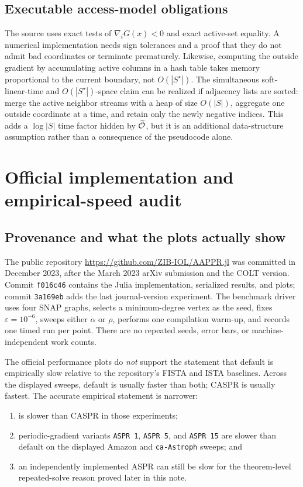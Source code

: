 \documentclass[11pt]{article}
\begin{document}
\subsection{Executable access-model obligations}

The source uses exact tests of $\nabla_iG(x)<0$ and exact active-set equality.
A numerical implementation needs sign tolerances and a proof that they do not
admit bad coordinates or terminate prematurely.  Likewise, computing the
outside gradient by accumulating active columns in a hash table takes memory
proportional to the current boundary, not $O(|S^\star|)$.  The simultaneous
soft-linear-time and $O(|S^\star|)$-space claim can be realized if adjacency
lists are sorted: merge the active neighbor streams with a heap of size
$O(|S|)$, aggregate one outside coordinate at a time, and retain only the
newly negative indices.  This adds a $\log|S|$ time factor hidden by
$\widetilde{\mathcal{O}}$, but it is an additional data-structure assumption rather than a
consequence of the pseudocode alone.

\section{Official implementation and empirical-speed audit}
\label{sec:implementation-audit}

\subsection{Provenance and what the plots actually show}

The public repository
\url{https://github.com/ZIB-IOL/AAPPR.jl} was committed in December 2023,
after the March 2023 arXiv submission and the COLT version.  Commit
\texttt{f016c46} contains the Julia implementation, serialized results, and
plots; commit \texttt{3a169eb} adds the last journal-version experiment.  The
benchmark driver uses four SNAP graphs, selects a minimum-degree vertex as the
seed, fixes $\varepsilon=10^{-6}$, sweeps either $\alpha$ or $\rho$, performs
one compilation warm-up, and records one timed run per point.  There are no
repeated seeds, error bars, or machine-independent work counts.

The official performance plots do \emph{not} support the statement that
default \ASPR{} is empirically slow relative to the repository's FISTA and
ISTA baselines.  Across the displayed sweeps, default \ASPR{} is usually
faster than both; CASPR is usually fastest.  The accurate empirical statement
is narrower:
\begin{enumerate}[leftmargin=*]
\item \ASPR{} is slower than CASPR in those experiments;
\item periodic-gradient variants
      \texttt{ASPR 1}, \texttt{ASPR 5}, and \texttt{ASPR 15}
      are slower than default \ASPR{} on the displayed Amazon and
      \texttt{ca-Astroph} sweeps; and
\item an independently implemented ASPR can still be slow for the
      theorem-level repeated-solve reason proved later in this note.
\end{enumerate}
\end{document}
